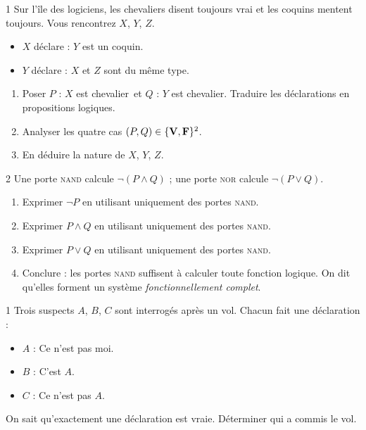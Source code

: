 \begin{probleme}{1}
Sur l'\^ile des logiciens, les chevaliers disent toujours vrai
et les coquins mentent toujours. Vous rencontrez $X$, $Y$, $Z$.
\begin{itemize}
  \item $X$ d\'eclare : \og $Y$ est un coquin.\fg
  \item $Y$ d\'eclare : \og $X$ et $Z$ sont du m\^eme type.\fg
\end{itemize}
\begin{enumerate}
  \item Poser $P$ : \og $X$ est chevalier\fg\ et $Q$ : \og $Y$ est chevalier\fg.
        Traduire les d\'eclarations en propositions logiques.
  \item Analyser les quatre cas $(P,Q)\in\{\textbf{V},\textbf{F}\}^2$.
  \item En d\'eduire la nature de $X$, $Y$, $Z$.
\end{enumerate}
\end{probleme}

\begin{probleme}{2}
Une porte \textsc{nand} calcule $\lnot(P \land Q)$ ;
une porte \textsc{nor} calcule $\lnot(P \lor Q)$.
\begin{enumerate}
  \item Exprimer $\lnot P$ en utilisant uniquement des portes \textsc{nand}.
  \item Exprimer $P \land Q$ en utilisant uniquement des portes \textsc{nand}.
  \item Exprimer $P \lor Q$ en utilisant uniquement des portes \textsc{nand}.
  \item Conclure : les portes \textsc{nand} suffisent \`a calculer toute
        fonction logique. On dit qu'elles forment un syst\`eme \emph{fonctionnellement complet}.
\end{enumerate}
\end{probleme}

\begin{probleme}{1}
Trois suspects $A$, $B$, $C$ sont interrog\'es apr\`es un vol.
Chacun fait une d\'eclaration :
\begin{itemize}
  \item $A$ : \og Ce n'est pas moi.\fg
  \item $B$ : \og C'est $A$.\fg
  \item $C$ : \og Ce n'est pas $A$.\fg
\end{itemize}
On sait qu'exactement une d\'eclaration est vraie.
D\'eterminer qui a commis le vol.
\end{probleme}

